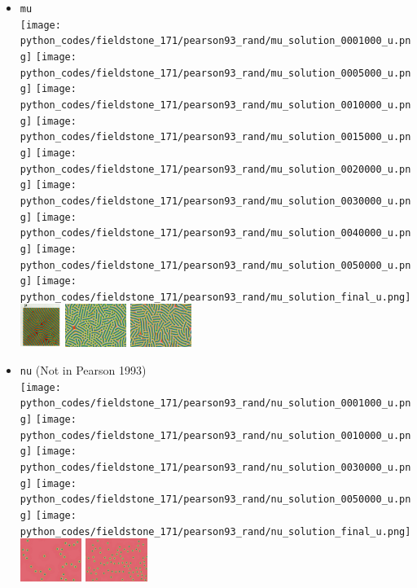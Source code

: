 \begin{itemize}
\item {\tt mu}\\
\texttt{[image: python\_codes/fieldstone\_171/pearson93\_rand/mu\_solution\_0001000\_u.png]}
\texttt{[image: python\_codes/fieldstone\_171/pearson93\_rand/mu\_solution\_0005000\_u.png]}
\texttt{[image: python\_codes/fieldstone\_171/pearson93\_rand/mu\_solution\_0010000\_u.png]}
\texttt{[image: python\_codes/fieldstone\_171/pearson93\_rand/mu\_solution\_0015000\_u.png]}
\texttt{[image: python\_codes/fieldstone\_171/pearson93\_rand/mu\_solution\_0020000\_u.png]}
\texttt{[image: python\_codes/fieldstone\_171/pearson93\_rand/mu\_solution\_0030000\_u.png]}
\texttt{[image: python\_codes/fieldstone\_171/pearson93\_rand/mu\_solution\_0040000\_u.png]}
\texttt{[image: python\_codes/fieldstone\_171/pearson93\_rand/mu\_solution\_0050000\_u.png]}
\texttt{[image: python\_codes/fieldstone\_171/pearson93\_rand/mu\_solution\_final\_u.png]}\\
\includegraphics[height=1.4cm]{python_codes/fieldstone_171/images/pear93_mu}
\includegraphics[height=1.4cm]{python_codes/fieldstone_171/images/munafo_mu1}
\includegraphics[height=1.4cm]{python_codes/fieldstone_171/images/munafo_mu2}



\item {\tt nu} (Not in Pearson 1993)\\
\texttt{[image: python\_codes/fieldstone\_171/pearson93\_rand/nu\_solution\_0001000\_u.png]}
\texttt{[image: python\_codes/fieldstone\_171/pearson93\_rand/nu\_solution\_0010000\_u.png]}
\texttt{[image: python\_codes/fieldstone\_171/pearson93\_rand/nu\_solution\_0030000\_u.png]}
\texttt{[image: python\_codes/fieldstone\_171/pearson93\_rand/nu\_solution\_0050000\_u.png]}
\texttt{[image: python\_codes/fieldstone\_171/pearson93\_rand/nu\_solution\_final\_u.png]}\\
\includegraphics[height=1.4cm]{python_codes/fieldstone_171/images/munafo_nu1}
\includegraphics[height=1.4cm]{python_codes/fieldstone_171/images/munafo_nu2}


\end{itemize}
